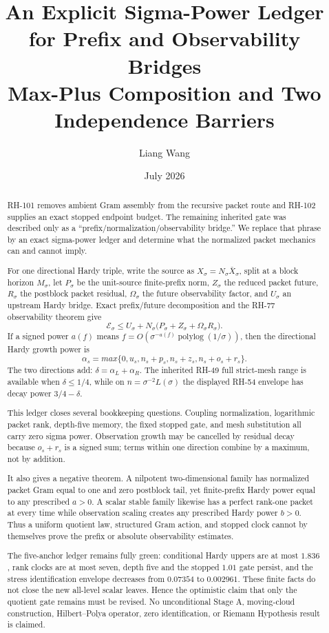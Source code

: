 \documentclass[11pt]{article}
\title{An Explicit Sigma-Power Ledger for Prefix and Observability Bridges\\
\large Max-Plus Composition and Two Independence Barriers}
\author{Liang Wang}
\date{July 2026}
\theoremstyle{definition}
\theoremstyle{remark}
\begin{document}
\maketitle

\begin{abstract}
RH-101 removes ambient Gram assembly from the recursive packet route and
RH-102 supplies an exact stopped endpoint budget.  The remaining inherited
gate was described only as a ``prefix/normalization/observability bridge.''
We replace that phrase by an exact sigma-power ledger and determine what the
normalized packet mechanics can and cannot imply.

For one directional Hardy triple, write the source as
$X_\sigma=N_\sigma\bar X_\sigma$, split at a block horizon $M_\sigma$, let
$P_\sigma$ be the unit-source finite-prefix norm, $Z_\sigma$ the reduced
packet future, $R_\sigma$ the postblock packet residual, $\Omega_\sigma$ the
future observability factor, and $U_\sigma$ an upstream Hardy bridge.  Exact
prefix/future decomposition and the RH-77 observability theorem give
\[
 \mathcal E_\sigma
 \le U_\sigma+N_\sigma
 \bigl(P_\sigma+Z_\sigma+\Omega_\sigma R_\sigma\bigr).
\]
If a signed power $a(f)$ means
$f=O(\sigma^{-a(f)}\operatorname{polylog}(1/\sigma))$, then the directional
Hardy growth power is
\[
 \alpha_s=max\{0,u_s,n_s+p_s,n_s+z_s,n_s+o_s+r_s\}.
\]
The two directions add:
$\delta=\alpha_L+\alpha_R$.  The inherited RH-49 full strict-mesh range is
available when $\delta\le1/4$, while on
$n=\sigma^{-2}L(\sigma)$ the displayed RH-54 envelope has decay power
$3/4-\delta$.

This ledger closes several bookkeeping questions.  Coupling normalization,
logarithmic packet rank, depth-five memory, the fixed stopped gate, and mesh
substitution all carry zero sigma power.  Observation growth may be cancelled
by residual decay because $o_s+r_s$ is a signed sum; terms within one direction
combine by a maximum, not by addition.

It also gives a negative theorem.  A nilpotent two-dimensional family has
normalized packet Gram equal to one and zero postblock tail, yet finite-prefix
Hardy power equal to any prescribed $a>0$.  A scalar stable family likewise
has a perfect rank-one packet at every time while observation scaling creates
any prescribed Hardy power $b>0$.  Thus a uniform quotient law, structured
Gram action, and stopped clock cannot by themselves prove the prefix or
absolute observability estimates.

The five-anchor ledger remains fully green: conditional Hardy uppers are at
most $1.836$, rank clocks are at most seven, depth five and the stopped
$1.01$ gate persist, and the stress identification envelope decreases from
$0.07354$ to $0.002961$.  These finite facts do not close the new all-level
scalar leaves.  Hence the optimistic claim that only the quotient gate
remains must be revised.  No unconditional Stage A, moving-cloud
construction, Hilbert--Polya operator, zero identification, or Riemann
Hypothesis result is claimed.
\end{abstract}
\end{document}
